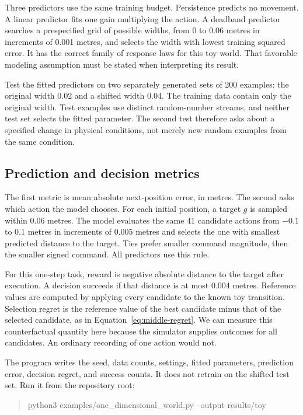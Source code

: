 Three predictors use the same training budget. Persistence predicts no movement. A linear predictor fits one gain multiplying the action. A deadband predictor searches a prespecified grid of possible widths, from 0 to 0.06 metres in increments of 0.001 metres, and selects the width with lowest training squared error. It has the correct family of response laws for this toy world. That favorable modeling assumption must be stated when interpreting its result.

Test the fitted predictors on two separately generated sets of 200 examples: the original width 0.02 and a shifted width 0.04. The training data contain only the original width. Test examples use distinct random-number streams, and neither test set selects the fitted parameter. The second test therefore asks about a specified change in physical conditions, not merely new random examples from the same condition.

\subsection{Prediction and decision metrics}
The first metric is mean absolute next-position error, in metres. The second asks which action the model chooses. For each initial position, a target $g$ is sampled within 0.06 metres. The model evaluates the same 41 candidate actions from $-0.1$ to $0.1$ metres in increments of 0.005 metres and selects the one with smallest predicted distance to the target. Ties prefer smaller command magnitude, then the smaller signed command. All predictors use this rule.

For this one-step task, reward is negative absolute distance to the target after execution. A decision succeeds if that distance is at most 0.004 metres. Reference values are computed by applying every candidate to the known toy transition. Selection regret is the reference value of the best candidate minus that of the selected candidate, as in Equation~\eqref{eq:middle-regret}. We can measure this counterfactual quantity here because the simulator supplies outcomes for all candidates. An ordinary recording of one action would not.

The program writes the seed, data counts, settings, fitted parameters, prediction error, decision regret, and success counts. It does not retrain on the shifted test set. Run it from the repository root:
\begin{quote}\ttfamily\small
python3 examples/one\_dimensional\_world.py --output results/toy
\end{quote}

